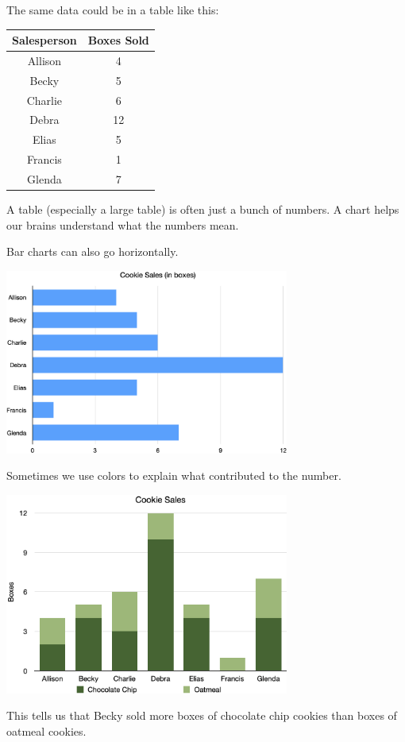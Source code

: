 The same data could be in a table like this:

\begin{tabular}{c | c}
  Salesperson & Boxes Sold \\
  \hline
  Allison & 4 \\
  Becky & 5 \\
  Charlie & 6\\
  Debra & 12\\
  Elias & 5\\
  Francis & 1\\
  Glenda & 7
\end{tabular}

A table (especially a large table) is often just a bunch of
numbers. A chart helps our brains understand what the numbers mean.

Bar charts can also go horizontally.

\includegraphics[width=0.7\textwidth]{HorizontalBarCookies.png}

Sometimes we use colors to explain what contributed to the number.

\includegraphics[width=0.7\textwidth]{TypesCookieBar.png}

This tells us that Becky sold more boxes of chocolate chip cookies
than boxes of oatmeal cookies.

